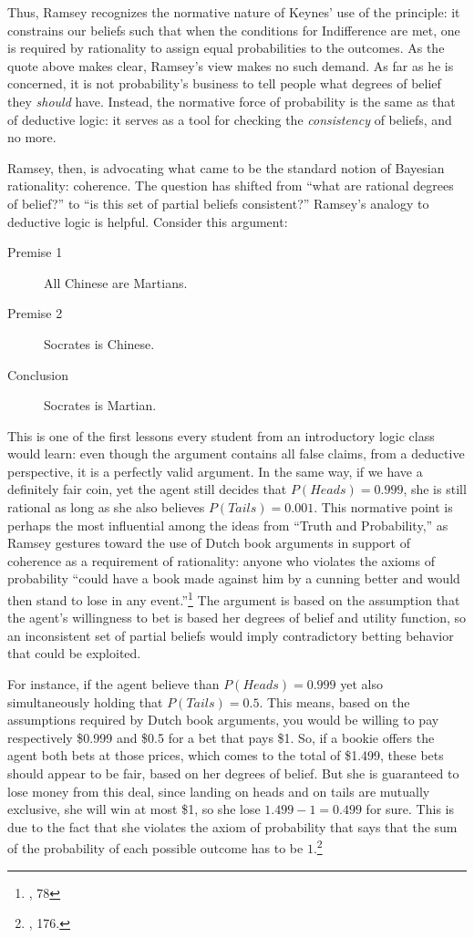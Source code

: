 Thus, Ramsey recognizes the normative nature of Keynes' use of the
principle: it constrains our beliefs such that when the conditions for
Indifference are met, one is required by rationality to assign equal probabilities to the outcomes. As the quote above
makes clear, Ramsey's view makes no such demand. As far as he is
concerned, it is not probability's business to tell people what degrees
of belief they \emph{should} have. Instead, the normative force of
probability is the same as that of deductive logic: it serves as a tool
for checking the \emph{consistency} of  beliefs, and no more.

Ramsey, then, is advocating what came to be the standard notion of
Bayesian rationality: coherence. The question has shifted from ``what
are rational degrees of belief?'' to ``is this set of partial beliefs
consistent?'' Ramsey's analogy to deductive logic is helpful. Consider
this argument:

\begin{description}
	\item[Premise 1] All Chinese are Martians.
	\item[Premise 2]  Socrates is Chinese.
	\item[Conclusion] Socrates is Martian.
\end{description}

This is one of the first lessons every student from an introductory logic class would learn: even though the argument contains all false claims, from a deductive
perspective, it is a perfectly valid argument. In the same way, if we
have a definitely fair coin, yet the agent still decides that
\(P(Heads)=0.999\), she is still rational as long as she also believes
\(P(Tails) = 0.001\). This normative point is perhaps the most
influential among the ideas from ``Truth and Probability,'' as Ramsey
gestures toward the use of Dutch book arguments in support of coherence
as a requirement of rationality: anyone who violates the axioms of
probability ``could have a book made against him by a cunning better and
would then stand to lose in any event.''\footnote{\cite{ramsey}, 78} The argument
is based on the assumption that the agent's willingness to bet is based
her degrees of belief and utility function, so an inconsistent set of
partial beliefs would imply contradictory betting behavior that could be
exploited.

For instance, if the agent believe than \(P(Heads) = 0.999\) yet also
simultaneously holding that \(P(Tails) = 0.5\). This means, based on the
assumptions required by Dutch book arguments, you would be willing to
pay respectively \$0.999 and \$0.5 for a bet that pays \$1. So, if a
bookie offers the agent both bets at those prices, which comes to the
total of \$1.499, these bets should appear to be fair, based on her
degrees of belief. But she is guaranteed to lose money from this deal,
since landing on heads and on tails are mutually exclusive, she will win
at most \$1, so she lose \(1.499 - 1 = 0.499\) for sure. This is due to
the fact that she violates the axiom of probability that says that the
sum of the probability of each possible outcome has to be
\(1\).\footnote{\cite{hajekdutchbook}, 176.}


